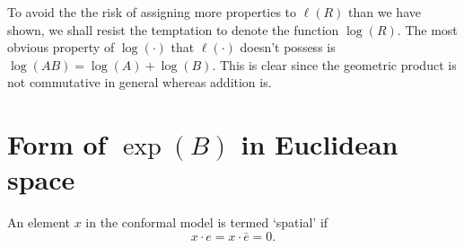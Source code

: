 To avoid the the risk of assigning more properties to $\ell(R)$ than we have
shown, we shall resist the temptation to denote the function $\log(R)$. The
most obvious property of $\log(\cdot)$ that $\ell(\cdot)$ doesn't possess is
$\log(AB) = \log(A) + \log(B)$. This is clear since the geometric product is
not commutative in general whereas addition is.

\section{Form of $\exp(B)$ in Euclidean space}
\label{subsec:form}

\begin{definition}
An element $x$ in the conformal model is termed `spatial' if
\[
x \cdot e = x \cdot \bar{e} = 0.
\]
\end{definition}


